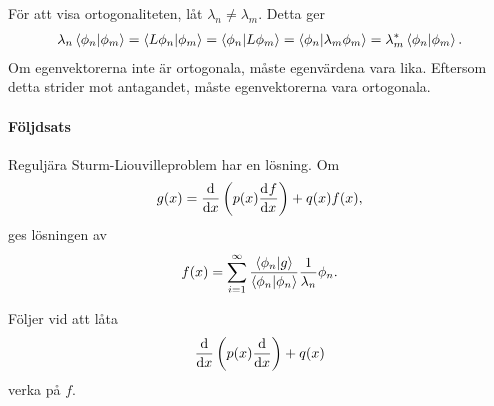 För att visa ortogonaliteten, låt $\lambda_{n} \neq \lambda_{m}$. Detta ger
\begin{align*}
	\lambda_{n}\bra{\phi_{n}}\ket{\phi_{m}} = \bra{L\phi_{n}}\ket{\phi_{m}} = \bra{\phi_{n}}\ket{L\phi_{m}} = \bra{\phi_{n}}\ket{\lambda_{m}\phi_{m}} = \lambda_{m}^{*}\bra{\phi_{n}}\ket{\phi_{m}}.
\end{align*}
Om egenvektorerna inte är ortogonala, måste egenvärdena vara lika. Eftersom detta strider mot antagandet, måste egenvektorerna vara ortogonala.

\paragraph{Följdsats}
Reguljära Sturm-Liouvilleproblem har en lösning. Om
\begin{align*}
	g(x) = \dv{x}\left(p(x)\dv[]{f}{x} (x)\right) + q(x)f(x),
\end{align*}
ges lösningen av
\begin{align*}
	f(x) = \sum\limits_{i = 1}^{\infty}\frac{\bra{\phi_{n}}\ket{g}}{\bra{\phi_{n}}\ket{\phi_{n}}}\frac{1}{\lambda_{n}}\phi_{n}.
\end{align*}

\proof
Följer vid att låta
\begin{align*}
	\dv{x}\left(p(x)\dv{x}\right) + q(x)
\end{align*}
verka på $f$.